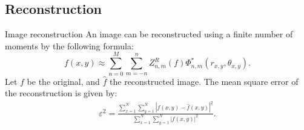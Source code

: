 \documentclass{beamer}
\begin{document}

\subsection{Reconstruction}
\begin{frame}{Image reconstruction}
\vskip 10mm
An image can be reconstructed using a finite number of moments by the following formula: 
$$
f(x,y) \approx \sum_{n=0}^{M}\sum_{m=-n}^{n}Z_{n,m}^R(f)\Phi_{n,m}^*(r_{x,y},\theta_{x,y}).
$$
Let $f$ be the original, and $\widehat{f}$ the reconstructed image. The mean square error of the reconstruction is given by:
\begin{gather*}
    \varepsilon^2 = \frac{\displaystyle \sum_{x=1}^N\sum_{y=1}^N \left|f(x,y) - \widehat{f}(x,y)\right|^2}{\displaystyle \sum_{x=1}^N\sum_{y=1}^N \left|f(x,y)\right|^2}.
\end{gather*}
\end{frame}
\end{document}
